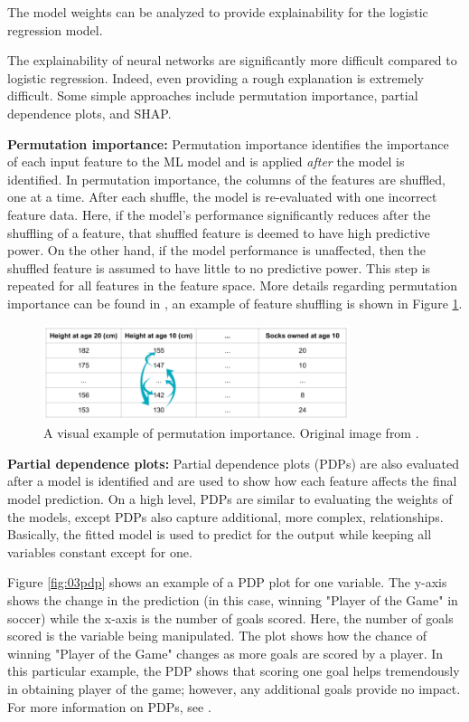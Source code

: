 The model weights can be analyzed to provide explainability for the logistic regression model.

The explainability of neural networks are significantly more difficult compared to logistic regression.  Indeed, even providing a rough explanation is extremely difficult. Some simple approaches include permutation importance, partial dependence plots, and SHAP.  

\textbf{Permutation importance:} Permutation importance identifies the importance of each input feature to the ML model and is applied \textit{after} the model is identified.  In permutation importance, the columns of the features are shuffled, one at a time.  After each shuffle, the model is re-evaluated with  one incorrect feature data.  Here, if the model's performance significantly reduces after the shuffling of a feature, that shuffled feature is deemed to have high predictive power.  On the other hand, if the model performance is unaffected, then the shuffled feature is assumed to have little to no predictive power. This step is repeated for all features in the feature space. More details regarding permutation importance can be found in \cite{perm_imp}, an example of feature shuffling is shown in Figure \ref{fig:03perm_imp}.
\begin{figure}[H]
    \centering
    \includegraphics[width=0.8\textwidth]{images/ch3/perm_imp.jpeg}
    \caption{A visual example of permutation importance. Original image from \cite{img_perm_imp}.}
    \label{fig:03perm_imp}
\end{figure}


\textbf{Partial dependence plots:} Partial dependence plots (PDPs) are also evaluated after a model is identified and are used to show how each feature affects the final model prediction.  On a high level, PDPs are similar to evaluating the weights of the models, except PDPs also capture additional, more complex, relationships.  Basically, the fitted model is used to predict for the output while keeping all variables constant except for one.  

Figure \ref{fig:03pdp} shows an example of a PDP plot for one variable.  The y-axis shows the change in the prediction (in this case, winning "Player of the Game" in soccer) while the x-axis is the number of goals scored. Here, the number of goals scored is the variable being manipulated. The plot shows how the chance of winning "Player of the Game" changes as more goals are scored by a player.  In this particular example, the PDP shows that scoring one goal helps tremendously in obtaining player of the game; however, any additional goals provide no impact. For more information on PDPs, see \cite{pdp}.


